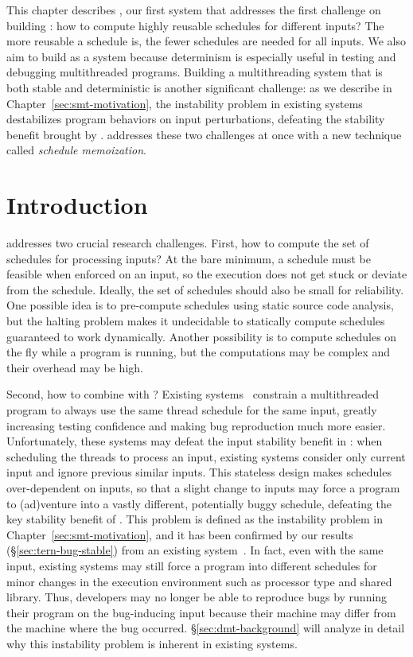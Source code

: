 This chapter describes \tern, our first \smt system that
addresses the first challenge on building \smt: how to compute highly reusable
schedules for different inputs? The more reusable a schedule is, the fewer
schedules are needed for all inputs. We also aim to build \tern as a \dmt 
system because determinism is especially useful in testing and debugging 
multithreaded programs. Building a multithreading system that is both stable 
and deterministic is another significant challenge: as we describe in 
Chapter~\ref{sec:smt-motivation}, the instability problem in existing \dmt 
systems destabilizes program behaviors on input perturbations,
defeating the stability benefit brought by \smt. \tern addresses these two 
challenges at once with a new technique called \emph{schedule memoization}.


\section{Introduction} \label{sec:tern-overview}

\tern addresses two crucial research challenges. First, how to compute the set
of schedules for processing inputs?  At the bare minimum, a schedule must be
feasible when enforced on an input, so the execution does not get stuck or
deviate from the schedule.  Ideally, the set of schedules should also be small
for reliability.  One possible idea is to pre-compute schedules using static
source code analysis, but the halting problem makes it undecidable to
statically compute schedules guaranteed to work dynamically.  Another
possibility is to compute schedules on the fly while a program is running,
but the computations may be complex and their overhead may be high.

Second, how to combine \dmt with \smt? Existing \dmt
systems~\cite{dmp:asplos09,coredet:asplos10,kendo:asplos09} constrain a
multithreaded program to always use the same thread schedule for the same input,
greatly increasing testing confidence and making bug reproduction much more
easier. Unfortunately, these \dmt systems may defeat the input stability
benefit in \smt: when scheduling the threads to process an
input, existing \dmt systems consider only current input and ignore previous
similar inputs.  This stateless design makes schedules over-dependent on inputs,
so that a slight change to inputs may force a program to (ad)venture into a
vastly different, potentially buggy schedule, defeating the key stability
benefit of \smt.  This problem is defined as the instability problem in 
Chapter~\ref{sec:smt-motivation}, and it has been
confirmed by our results (\S\ref{sec:tern-bug-stable}) from an existing \dmt
system~\cite{coredet:asplos10}. In fact, even with the same 
input, existing \dmt systems may still force a program into different schedules 
for minor changes in the execution environment such as processor type and 
shared library.  Thus, developers may no longer be able to reproduce bugs by 
running their program on the bug-inducing input because their machine may 
differ from the machine where the bug occurred. \S\ref{sec:dmt-background} will 
analyze in detail why this instability problem is inherent in existing \dmt 
systems.

